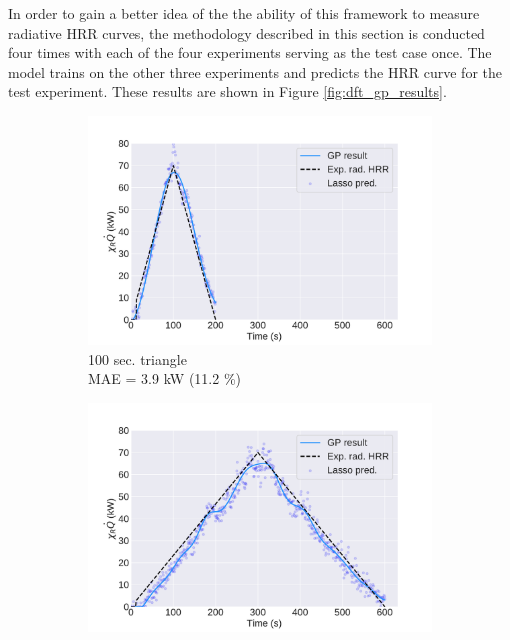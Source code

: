\documentclass{article}
\begin{document}
In order to gain a better idea of the the ability of this framework to measure radiative HRR curves, the methodology described in this section is conducted four times with each of the four experiments serving as the test case once. The model trains on the other three experiments and predicts the HRR curve for the test experiment. These results are shown in Figure \ref{fig:dft_gp_results}.

\begin{figure}[htbp]
  \centering
  \begin{subfigure}[t]{.45\textwidth}
      \centering
      \includegraphics[width=\textwidth,keepaspectratio]{figures/dft_result_100s_triangle.pdf}
      \caption{100 sec. triangle \\ MAE = 3.9 kW (11.2 \%) }
      \label{fig:dft_result_100s_triangle}
  \end{subfigure}
  \begin{subfigure}[t]{.45\textwidth}
      \centering
      \includegraphics[width=\textwidth ,keepaspectratio]{figures/dft_result_300s_triangle.pdf}

\end{subfigure}
\end{figure}
\end{document}
